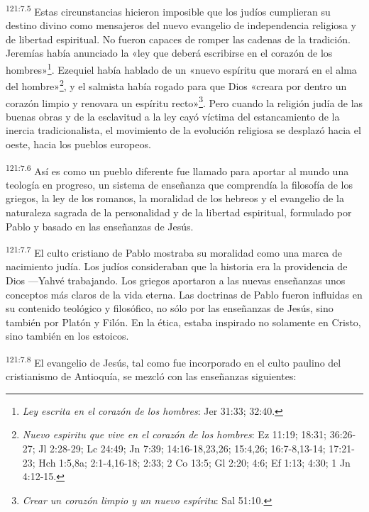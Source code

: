 \par 
\textsuperscript{121:7.5} Estas circunstancias hicieron imposible que los judíos cumplieran su destino divino como mensajeros del nuevo evangelio de independencia religiosa y de libertad espiritual. No fueron capaces de romper las cadenas de la tradición. Jeremías había anunciado la «ley que deberá escribirse en el corazón de los hombres»\footnote{\textit{Ley escrita en el corazón de los hombres}: Jer 31:33; 32:40.}. Ezequiel había hablado de un «nuevo espíritu que morará en el alma del hombre»\footnote{\textit{Nuevo espiritu que vive en el corazón de los hombres}: Ez 11:19; 18:31; 36:26-27; Jl 2:28-29; Lc 24:49; Jn 7:39; 14:16-18,23,26; 15:4,26; 16:7-8,13-14; 17:21-23; Hch 1:5,8a; 2:1-4,16-18; 2:33; 2 Co 13:5; Gl 2:20; 4:6; Ef 1:13; 4:30; 1 Jn 4:12-15.}, y el salmista había rogado para que Dios «creara por dentro un corazón limpio y renovara un espíritu recto»\footnote{\textit{Crear un corazón limpio y un nuevo espíritu}: Sal 51:10.}. Pero cuando la religión judía de las buenas obras y de la esclavitud a la ley cayó víctima del estancamiento de la inercia tradicionalista, el movimiento de la evolución religiosa se desplazó hacia el oeste, hacia los pueblos europeos.

\par 
\textsuperscript{121:7.6} Así es como un pueblo diferente fue llamado para aportar al mundo una teología en progreso, un sistema de enseñanza que comprendía la filosofía de los griegos, la ley de los romanos, la moralidad de los hebreos y el evangelio de la naturaleza sagrada de la personalidad y de la libertad espiritual, formulado por Pablo y basado en las enseñanzas de Jesús.

\par 
\textsuperscript{121:7.7} El culto cristiano de Pablo mostraba su moralidad como una marca de nacimiento judía. Los judíos consideraban que la historia era la providencia de Dios ---Yahvé trabajando. Los griegos aportaron a las nuevas enseñanzas unos conceptos más claros de la vida eterna. Las doctrinas de Pablo fueron influidas en su contenido teológico y filosófico, no sólo por las enseñanzas de Jesús, sino también por Platón y Filón. En la ética, estaba inspirado no solamente en Cristo, sino también en los estoicos.

\par 
\textsuperscript{121:7.8} El evangelio de Jesús, tal como fue incorporado en el culto paulino del cristianismo de Antioquía, se mezcló con las enseñanzas siguientes:

